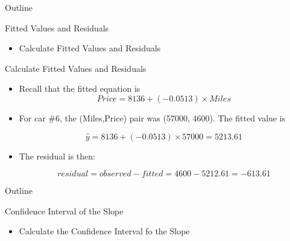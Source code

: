 \documentclass[14pt]{beamer}\usepackage[]{graphicx}\usepackage[]{color}
\begin{document}
\begin{frame}[fragile]{Outline}

Fitted Values and Residuals

\begin{itemize}
\item Calculate Fitted Values and Residuals
\end{itemize}

\end{frame}

\begin{frame}[fragile]{Calculate Fitted Values and Residuals}

\begin{itemize}

\item Recall that the fitted equation is
{\footnotesize{
\begin{equation*}
Price = 8136 + (-0.0513) \times Miles 
\end{equation*}
}}

\vspace{-3mm}

\item For car \#6, the (Miles,Price) pair was (57000, 4600). The fitted value is

{\footnotesize{
\begin{equation*}
\hat{y} = 8136 + (-0.0513) \times 57000 = 5213.61
\end{equation*}
}}

\vspace{-3mm}

\item The residual is then:

{\footnotesize{
\begin{equation*}
residual = observed - fitted = 4600 - 5212.61 = -613.61 
\end{equation*}
}}
\end{itemize}
\end{frame}

\begin{frame}[fragile]{Outline}

Confidence Interval of the Slope

\begin{itemize}
\item Calculate the Confidence Interval fo the Slope
\end{itemize}

\end{frame}
\end{document}
